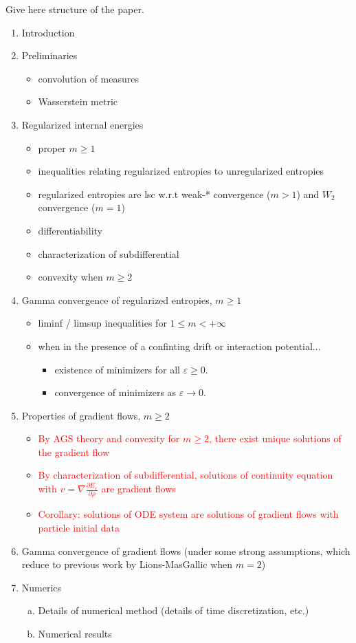 \documentclass[11pt,leqno]{amsart}
\theoremstyle{definition}
\newcommand{\comment}[1]{{\color{red}#1}} %
\newcommand{\grad}{\nabla}
\def\e{\varepsilon}
\begin{document}
\comment{Give here structure of the paper.}
\begin{enumerate}[1)]
\item Introduction
\item Preliminaries
\begin{itemize}
\item convolution of measures
\item Wasserstein metric
\end{itemize}
\item Regularized internal energies
\begin{itemize}
\item proper $m \geq 1$
\item inequalities relating regularized entropies to unregularized entropies
\item regularized entropies are lsc w.r.t weak-* convergence ($m>1$) and $W_2$ convergence ($m=1$)
\item differentiability
\item characterization of subdifferential
\item convexity when $m\geq2$
\end{itemize}
\item Gamma convergence of regularized entropies, $m \geq 1$
\begin{itemize}
\item liminf / limsup inequalities for $1\leq m < +\infty$
\item when in the presence of a confinting drift or interaction potential...
\begin{itemize}
\item existence of minimizers for all $\e \geq 0$.
\item convergence of minimizers as $\e \to 0$.
\end{itemize}
\end{itemize}
\item Properties of gradient flows, $m \geq 2$
\begin{itemize}
\item \textcolor{red}{By AGS theory and convexity for $m \geq 2$, there exist unique solutions of the gradient flow}
\item \textcolor{red}{By characterization of subdifferential, solutions of continuity equation with $v = \grad \frac{\partial E_\e}{\partial \rho}$ are gradient flows}
\item \textcolor{red}{Corollary: solutions of ODE system are solutions of gradient flows with particle initial data}
\end{itemize}
\item Gamma convergence of gradient flows (under some strong assumptions, which reduce to previous work by Lions-MasGallic when $m=2$)
\item Numerics
\begin{enumerate}[(a)]
\item Details of numerical method (details of time discretization, etc.)
\item Numerical results
\end{enumerate}
\end{enumerate}
\end{document}
